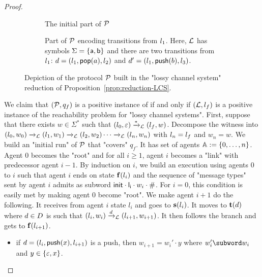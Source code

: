 \begin{proof}
	\begin{figure}[h]
	\begin{subfigure}[b]{0.99\textwidth}
	\centering
	
	\caption{The initial part of $\mathcal{P}$}\label{fig:lcs-choice}
	\end{subfigure}
	\begin{subfigure}[b]{0.99\textwidth}
	\centering
	
	\caption{Part of $\mathcal{P}$ encoding transitions from $l_1$. Here, $\mathcal{L}$ has symbols $\Sigma = \{\mathsf{a},\mathsf{b}\}$ and there are two transitions from $l_1$: $d = (l_1, \mathsf{pop}(a), l_2)$ and $d' = (l_1, \mathsf{push}(b), l_3)$.}\label{fig:lcs-trans}
	\end{subfigure}
	\caption{Depiction of the protocol $\mathcal{P}$ built in the "lossy channel system" reduction of Proposition~\ref{prop:reduction-LCS}.}
	\end{figure}
	We claim that $(\mathcal{P}, q_f)$ is a positive instance of \COVER if and only if $(\mathcal{L}, l_f)$ is a positive instance of the reachability problem for "lossy channel systems".
	First, suppose that there exists $w \in \Sigma^*$ such that $(l_0, \varepsilon) \xrightarrow{*}_{\mathcal{L}} (l_f, w)$. Decompose the witness into $(l_0, w_0) \xrightarrow{}_{\mathcal{L}} (l_1, w_1) \xrightarrow{}_{\mathcal{L}} (l_2, w_2) \cdots \xrightarrow{}_{\mathcal{L}} (l_n,w_n)$ with $l_n = l_f$ and $w_n =w$. 
	We build an "initial run" of $\mathcal{P}$ that "covers" $q_f$. It has set of agents $\mathbb{A} := \{0,\dots, n\}$. Agent $0$ becomes the "root" and for all $i \geq 1$, agent $i$ becomes a "link" with predecessor agent $i-1$. By induction on $i$, we build an execution using agents $0$ to $i$ such that agent $i$ ends on state $\mathbf{f}(l_i)$ and the sequence of "message types" sent by agent $i$ admits as subword $\mathsf{init} \cdot \mathsf{l_i} \cdot w_i \cdot \mathsf{\#}$. For $i=0$, this condition is easily met by making agent $0$ become "root". We make agent $i+1$ do the following. It receives from agent $i$ state $l_i$ and goes to $\mathbf{s}(l_i)$. It moves to $\mathbf{t}(d)$ where $d \in D$ is such that $(l_i, w_i) \xrightarrow{d}_{\mathcal{L}} (l_{i+1}, w_{i+1})$. It then follows the branch and gets to $\mathbf{f}(l_{i+1})$. 
	\begin{itemize}
		\item if $d =(l_i,\mathsf{push}(x), l_{i+1})$ is a push, then $w_{i+1} = w_{i}' \cdot y$ where $w_i' \subword w_i$ and $y \in \{\varepsilon, x\}$. 

\end{itemize}
\end{proof}

